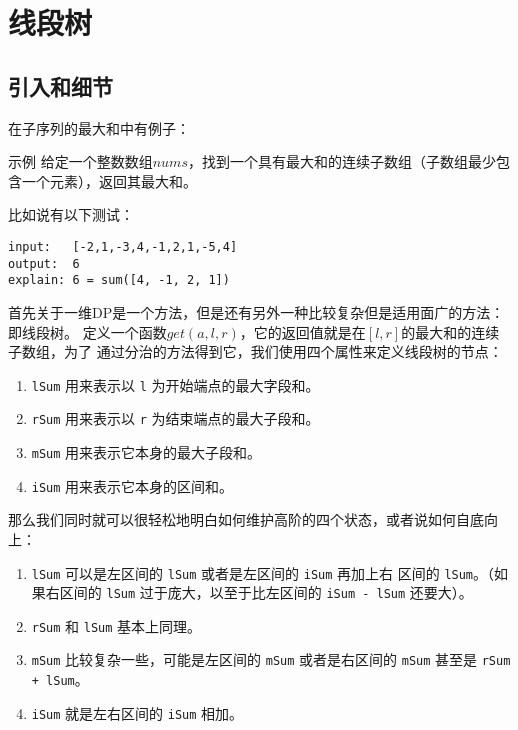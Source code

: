 
\section{线段树}

\begin{epi}
\end{epi}

\subsection{引入和细节}

在子序列的最大和中有例子：
\begin{Exple}{示例}
给定一个整数数组$nums$，找到一个具有最大和的连续子数组（子数组最少包含一个元素），返回其最大和。

比如说有以下测试：
\begin{lstlisting}
input:   [-2,1,-3,4,-1,2,1,-5,4]
output:  6
explain: 6 = sum([4, -1, 2, 1])
\end{lstlisting}
\end{Exple}

首先关于一维DP是一个方法，但是还有另外一种比较复杂但是适用面广的方法：即线段树。
定义一个函数$get(a, l, r)$，它的返回值就是在$[l, r]$的最大和的连续子数组，为了
通过分治的方法得到它，我们使用四个属性来定义线段树的节点：
\begin{enumerate}
\item \verb|lSum| 用来表示以 \verb|l| 为开始端点的最大字段和。
\item \verb|rSum| 用来表示以 \verb|r| 为结束端点的最大子段和。
\item \verb|mSum| 用来表示它本身的最大子段和。
\item \verb|iSum| 用来表示它本身的区间和。
\end{enumerate}

那么我们同时就可以很轻松地明白如何维护高阶的四个状态，或者说如何自底向上：
\begin{enumerate}
\item \verb|lSum| 可以是左区间的 \verb|lSum| 或者是左区间的 \verb|iSum| 再加上右
区间的 \verb|lSum|。（如果右区间的 \verb|lSum| 过于庞大，以至于比左区间的 %
\verb|iSum - lSum| 还要大）。
\item \verb|rSum| 和 \verb|lSum| 基本上同理。
\item \verb|mSum| 比较复杂一些，可能是左区间的 \verb|mSum| 或者是右区间的 %
\verb|mSum| 甚至是 \verb|rSum + lSum|。
\item \verb|iSum| 就是左右区间的 \verb|iSum| 相加。
\end{enumerate}

